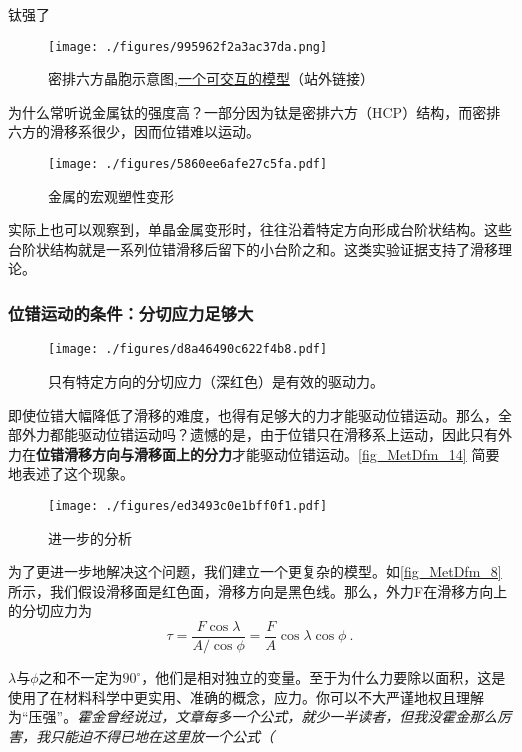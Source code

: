 \begin{example}{钛强了}
\begin{figure}[ht]
\centering
\texttt{[image: ./figures/995962f2a3ac37da.png]}
\caption{密排六方晶胞示意图,\href{https://www.geogebra.org/m/xrzejabt}{一个可交互的模型}（站外链接）} \label{fig_MetDfm_10}
\end{figure}
为什么常听说金属钛的强度高？一部分因为钛是密排六方（HCP）结构，而密排六方的滑移系很少，因而位错难以运动。
\end{example}

\begin{figure}[ht]
\centering
\texttt{[image: ./figures/5860ee6afe27c5fa.pdf]}
\caption{金属的宏观塑性变形} \label{fig_MetDfm_7}
\end{figure}
实际上也可以观察到，单晶金属变形时，往往沿着特定方向形成台阶状结构。这些台阶状结构就是一系列位错滑移后留下的小台阶之和。这类实验证据支持了滑移理论。


\subsubsection{位错运动的条件：分切应力足够大}

\begin{figure}[ht]
\centering
\texttt{[image: ./figures/d8a46490c622f4b8.pdf]}
\caption{只有特定方向的分切应力（深红色）是有效的驱动力。} \label{fig_MetDfm_14}
\end{figure}

即使位错大幅降低了滑移的难度，也得有足够大的力才能驱动位错运动。那么，全部外力都能驱动位错运动吗？遗憾的是，由于位错只在滑移系上运动，因此只有外力在\textbf{位错滑移方向与滑移面上的分力}才能驱动位错运动。\autoref{fig_MetDfm_14} 简要地表述了这个现象。

\begin{figure}[ht]
\centering
\texttt{[image: ./figures/ed3493c0e1bff0f1.pdf]}
\caption{进一步的分析} \label{fig_MetDfm_8}
\end{figure}

为了更进一步地解决这个问题，我们建立一个更复杂的模型。如\autoref{fig_MetDfm_8} 所示，我们假设滑移面是红色面，滑移方向是黑色线。那么，外力F在滑移方向上的分切应力为
\begin{equation}
\tau=\frac{F \cos \lambda}{A/{\cos \phi}}=\frac{F}{A}{\cos \lambda}{\cos \phi}~.
\end{equation}

$\lambda$与$\phi$之和不一定为$90^\circ$，他们是相对独立的变量。至于为什么力要除以面积，这是使用了在材料科学中更实用、准确的概念，应力。你可以不大严谨地权且理解为“压强”。\textsl{霍金曾经说过，文章每多一个公式，就少一半读者，但我没霍金那么厉害，我只能迫不得已地在这里放一个公式（}

